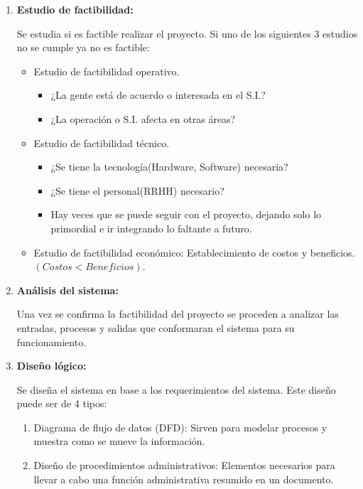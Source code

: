 \documentclass{templateNote}
\begin{document}
\begin{enumerate}
    \item \hypertarget{EF}{\textbf{Estudio de factibilidad:}} Se estudia si es factible realizar el proyecto. Si uno de los siguientes 3 estudios no se cumple ya no es factible:
    \begin{itemize}
        \item Estudio de factibilidad operativo.
        \begin{itemize}
            \item ¿La gente est\'a de acuerdo o interesada en el S.I.?
            \item ¿La operaci\'on o S.I. afecta en otras \'areas?
        \end{itemize}

        \item Estudio de factibilidad técnico.
        \begin{itemize}
            \item ¿Se tiene la tecnolog\'ia(Hardware, Software) necesaria?
            \item ¿Se tiene el personal(RRHH) necesario?
            \item Hay veces que se puede seguir con el proyecto, dejando solo lo primordial e ir integrando lo faltante a futuro.
        \end{itemize}
        \item Estudio de factibilidad económico: Establecimiento de costos y beneficios. $(Costos < Beneficios)$.
    \end{itemize}
    \item \hypertarget{AS}{\textbf{Análisis del sistema:}} Una vez se confirma la factibilidad del proyecto se proceden a analizar las entradas, procesos y salidas que conformaran el sistema para su funcionamiento.
    \item \hypertarget{DL}{\textbf{Diseño lógico:}} Se diseña el sistema en base a los requerimientos del sistema. Este diseño puede ser de 4 tipos:
        \begin{enumerate}
            \item Diagrama de flujo de datos (DFD): Sirven para modelar procesos y muestra como se mueve la información.
            \item Diseño de procedimientos administrativos: Elementos necesarios para llevar a cabo una función administrativa resumido en un documento.
            

\end{enumerate}
\end{enumerate}
\end{document}
